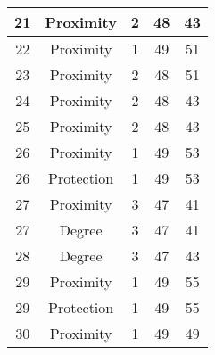 \documentclass[results.tex]{subfiles}
\begin{document}
\begin{center}
\begin{tabular}{| c || c | c | c | c |}
            \hline
            21                      & Proximity                    & 2                      & 48                      & 43                   \\
            \hline
            22                      & Proximity                    & 1                      & 49                      & 51                   \\
            \hline
            23                      & Proximity                    & 2                      & 48                      & 51                   \\
            \hline
            24                      & Proximity                    & 2                      & 48                      & 43                   \\
            \hline
            25                      & Proximity                    & 2                      & 48                      & 43                   \\
            \hline
            26                      & Proximity                    & 1                      & 49                      & 53                   \\
            \hline
            26                      & Protection                   & 1                      & 49                      & 53                   \\
            \hline
            27                      & Proximity                    & 3                      & 47                      & 41                   \\
            \hline
            27                      & Degree                       & 3                      & 47                      & 41                   \\
            \hline
            28                      & Degree                       & 3                      & 47                      & 43                   \\
            \hline
            29                      & Proximity                    & 1                      & 49                      & 55                   \\
            \hline
            29                      & Protection                   & 1                      & 49                      & 55                   \\
            \hline
            30                      & Proximity                    & 1                      & 49                      & 49                   \\

\end{tabular}
\end{center}
\end{document}
